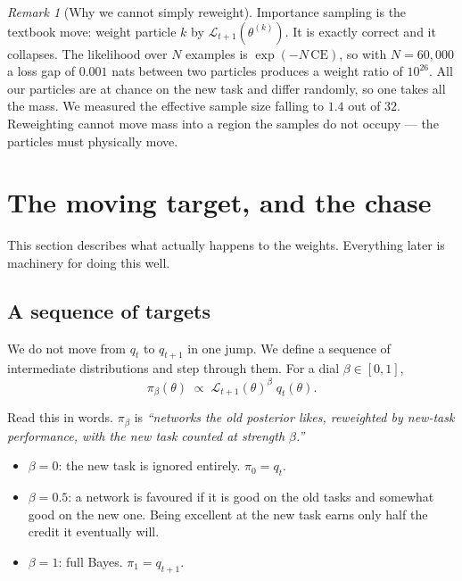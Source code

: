 \documentclass[11pt]{article}
\theoremstyle{definition}
\theoremstyle{plain}
\theoremstyle{remark}
\newtheorem{remark}[definition]{Remark}
\newcommand{\Lh}{\mathcal{L}}
\begin{document}
\begin{remark}[Why we cannot simply reweight]
Importance sampling is the textbook move: weight particle $k$ by
$\Lh_{t+1}(\theta^{(k)})$. It is exactly correct and it collapses. The
likelihood over $N$ examples is $\exp(-N\,\mathrm{CE})$, so with $N = 60{,}000$
a loss gap of $0.001$ nats between two particles produces a weight ratio of
$10^{26}$. All our particles are at chance on the new task and differ randomly,
so one takes all the mass. We measured the effective sample size falling to
$1.4$ out of $32$. Reweighting cannot move mass into a region the samples do not
occupy --- the particles must physically move.
\end{remark}

\section{The moving target, and the chase}
\label{sec:chase}

This section describes what actually happens to the weights. Everything later
is machinery for doing this well.

\subsection{A sequence of targets}

We do not move from $q_t$ to $q_{t+1}$ in one jump. We define a sequence of
intermediate distributions and step through them. For a dial
$\beta \in [0,1]$,
\begin{equation}
\pi_\beta(\theta) \;\propto\; \Lh_{t+1}(\theta)^{\beta} \; q_t(\theta).
\label{eq:path}
\end{equation}

Read this in words. $\pi_\beta$ is \emph{``networks the old posterior likes,
reweighted by new-task performance, with the new task counted at strength
$\beta$.''}

\begin{itemize}
\item $\beta = 0$: the new task is ignored entirely. $\pi_0 = q_t$.
\item $\beta = 0.5$: a network is favoured if it is good on the old tasks and
somewhat good on the new one. Being excellent at the new task earns only half
the credit it eventually will.
\item $\beta = 1$: full Bayes. $\pi_1 = q_{t+1}$.
\end{itemize}
\end{document}
